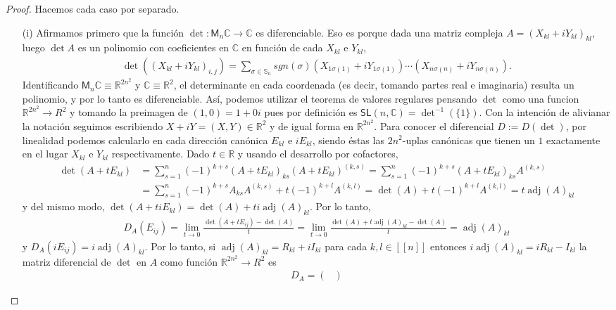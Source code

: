 \documentclass[11pt]{article}
\newcommand{\R}{\mathbb{R}}
\newcommand{\C}{\mathbb{C}}
\newcommand{\M}[2]{\mathsf{M}_{#1}#2}
\newcommand{\nat}[1]{[\![#1]\!]}
\newcommand{\adj}[1]{\operatorname{adj}(#1)}
\begin{document}
\begin{proof} Hacemos cada caso por separado.
\begin{itemize} 
\item[(i)] Afirmamos primero que la funci\'on $\det : \M{n}{\C} \to \C$ es diferenciable. Eso es porque dada una matriz compleja $A = (X_{kl}+iY_{kl})_{kl}$, luego $\det A$ es un polinomio con coeficientes en $\C$ en funci\'on de cada $X_{kl}$ e $Y_{kl}$,
\begin{align*}
\det((X_{kl}+iY_{kl})_{i,j}) = \sum_{\sigma \in \mathbb{S}_n}sgn(\sigma)(X_{1\sigma(1)}+iY_{1\sigma(1)}) \cdots (X_{n \sigma(n)}+iY_{n\sigma(n)}).
\end{align*}
Identificando $\M{n}{\C} \equiv \R^{2n^2}$ y $\C \equiv \R^2$, el determinante en cada coordenada (es decir, tomando partes real e imaginaria) resulta un polinomio, y por lo tanto es diferenciable. As\'i, podemos utilizar el teorema de valores regulares pensando $\det$ como una funcion $\R^{2n^2} \to R^2$ y tomando la preimagen de $(1,0) = 1+0i$ pues por definici\'on es $\mathsf{SL}(n,\C) = \det^{-1}(\{1\})$. Con la intenci\'on de alivianar la notaci\'on seguimos escribiendo $X+iY = (X,Y) \in \R^2$ y de igual forma en $\R^{2n^2}$. Para conocer el diferencial $D := D(\det)$, por linealidad podemos calcularlo en cada direcci\'on can\'onica $E_{kl}$ e $iE_{kl}$, siendo \'estas las $2n^2$-uplas can\'onicas que tienen un $1$ exactamente en el lugar $X_{kl}$ e $Y_{kl}$ respectivamente. Dado $t \in \R$ y usando el desarrollo por cofactores,
\begin{align*}
\det(A+tE_{kl}) &= \sum_{s=1}^n(-1)^{k+s}(A+tE_{kl})_{ks}(A+tE_{kl})^{(k,s)} = \sum_{s=1}^n(-1)^{k+s}(A+tE_{kl})_{ks}A^{(k,s)} \\ 
&= \sum_{s=1}^n(-1)^{k+s}A_{ks}A^{(k,s)} + t(-1)^{k+l}A^{(k,l)} = \det(A) + t(-1)^{k+l}A^{(k,l)} = t\adj{A}_{kl}
\end{align*}
y del mismo modo, $\det(A+tiE_{kl}) = \det(A) + ti\adj{A}_{kl}$. Por lo tanto,
\begin{align*}
D_A(E_{ij}) = \lim_{t \to 0} \frac{\det(A+tE_{ij}) - \det(A)}{t} = \lim_{t \to 0}\frac{\det(A)+t\adj{A}_{kl}-\det(A)}{t} = \adj{A}_{kl}
\end{align*}
y $D_A(iE_{ij}) = i\adj{A}_{kl}$. Por lo tanto, si $\adj{A}_{kl} = R_{kl} + iI_{kl}$ para cada $k,l \in \nat{n}$ entonces $i\adj{A}_{kl} = iR_{kl} - I_{kl}$ la matriz diferencial de $\det$ en $A$ como funci\'on $\R^{2n^2} \to R^2$ es
\begin{align*}
D_A = \begin{pmatrix}

\end{pmatrix}
\end{align*}
\end{itemize}
\end{proof}
\end{document}
